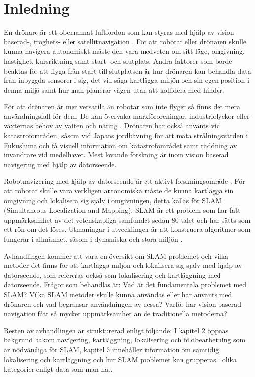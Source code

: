 \chapter{Inledning}

En drönare är ett obemannat luftfordon som kan styras med hjälp av vision baserad-, tröghets- eller satellitnavigation \citep{geospatial}. För att robotar eller drönaren skulle kunna navigera autonomiskt måste den vara medveten om sitt läge, omgivning, hastighet, kursriktning samt start- och slutplats. Andra faktorer som borde beaktas för att flyga från start till slutplatsen är hur drönaren kan behandla data från inbyggda sensorer i sig, det vill säga kartlägga miljön och sin egen position i denna miljö samt hur man planerar vägen utan att kollidera med hinder.

För att drönaren är mer versatila än robotar som inte flyger så finns det mera användningsfall för dem. De kan övervaka markföroreningar, industriolyckor eller växternas behov av vatten och näring \citep{crowdsurveillance}. Drönaren har också använts vid katastrofområden, såsom vid Japans jordbävning för att mäta strålningsvärden i Fukushima och få visuell information om katastrofområdet samt räddning av invandrare vid medelhavet. Mest lovande forskning är inom vision baserad navigering med hjälp av datorseende.

Robotnavigering med hjälp av datorseende är ett aktivt forskningsområde \citep{982903}. För att robotar skulle vara verkligen autonomiska måste de kunna kartlägga sin omgivning och lokalisera sig själv i omgivningen, detta kallas för SLAM (Simultaneous Localization and Mapping). SLAM är ett problem som har fått uppmärksamhet av det vetenskapliga samfundet sedan 80-talet och har sätts som ett rön om det löses. Utmaningar i utvecklingen är att konstruera algoritmer som fungerar i allmänhet, såsom i dynamiska och stora miljön \citep{realslamproblem}.

Avhandlingen kommer att vara en översikt om SLAM problemet och vilka metoder det finns för att kartlägga miljön och lokalisera sig själv med hjälp av datorseende, som refereras också som lokalisering och kartläggning med datorseende. Frågor som behandlas är: Vad är det fundamentala problemet med SLAM? Vilka SLAM metoder skulle kunna användas eller har använts med drönaren och vad begränsar användningen av dessa? Varför har vision baserad navigation fått så mycket uppmärksamhet än de traditionella metoderna?

Resten av avhandlingen är strukturerad enligt följande: I kapitel 2 öppnas bakgrund bakom navigering, kartläggning, lokalisering och bildbearbetning som är nödvändiga för SLAM, kapitel 3 innehåller information om samtidig lokalisering och kartläggning och hur SLAM problemet kan grupperas i olika kategorier enligt data som man har.

